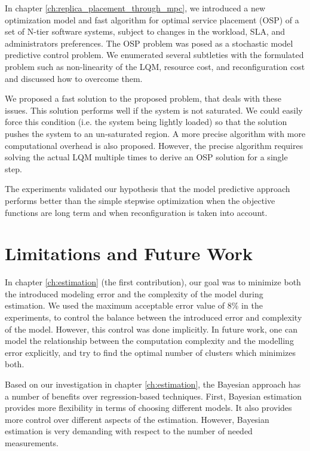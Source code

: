 In  chapter \ref{ch:replica_placement_through_mpc}, we introduced a new optimization model and fast algorithm for optimal service placement (OSP) of a set of N-tier software systems, subject to changes in the workload, SLA, and administrators preferences.
The OSP problem was posed as a stochastic model predictive control problem.
 We enumerated several subtleties with the formulated problem such as non-linearity of the LQM, resource cost, and reconfiguration cost and discussed how to overcome them. 

 We proposed a fast solution to the proposed problem, that deals with these issues.	This solution performs well if the system is not saturated. We could easily force this condition (i.e. the system being lightly loaded) so that the solution pushes the system to an un-saturated region. A more precise algorithm with more computational overhead is also proposed. However, the precise algorithm requires solving the actual LQM multiple times to derive an OSP solution for a single step.  
	
The experiments validated our hypothesis that the model predictive approach performs better than the simple stepwise optimization when the objective functions are long term and when reconfiguration is taken into account.

\section{Limitations and Future Work}
In chapter \ref{ch:estimation} (the first contribution), our goal was to minimize both the introduced modeling error and the complexity of the model during estimation.
We used the maximum acceptable error value of 8\% in the experiments, to control the balance between the introduced error and complexity of the model. 
However, this control was done implicitly.  
In future work, one can model the relationship between the computation complexity and the modelling error explicitly, and try to find the optimal number of clusters which minimizes both.  

Based on our investigation in chapter \ref{ch:estimation}, the Bayesian approach has a number of benefits over regression-based techniques. First, Bayesian estimation provides more flexibility in terms of choosing different models. It also provides more control over different aspects of the estimation. However, Bayesian estimation is very demanding with respect to the number of needed measurements.

